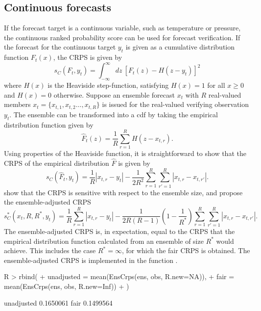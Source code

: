 \documentclass[article]{jss}
\begin{document}
\subsection{Continuous forecasts}


If the forecast target is a continuous variable, such as temperature or pressure, the continuous ranked probability score \citep{matheson1976scoring} can be used for forecast verification.
If the forecast for the continuous target $y_t$ is given as a cumulative distribution function $F_t(x)$, the CRPS is given by 
%
\begin{equation}
s_{C}(F_t, y_t) = \int_{-\infty}^\infty dz\ \left[F_t(z) - H(z-y_t)\right]^2
\end{equation}
%
where $H(x)$ is the Heaviside step-function, satisfying $H(x)=1$ for all $x\ge 0$ and $H(x)=0$ otherwise.
Suppose an ensemble forecast $x_t$ with $R$ real-valued members $x_t = \{x_{t,1}, x_{t,2} \dots, x_{t,R}\}$ is issued for the real-valued verifying observation $y_t$.
The ensemble can be transformed into a cdf by taking the empirical distribution function given by 
%
\begin{equation}
\hat{F}_t(z) = \frac{1}{R} \sum_{r=1}^{R} H(z - x_{t,r}).
\end{equation}
%
Using properties of the Heaviside function, it is straightforward to show that the CRPS of the empirical distribution $\hat{F}$ is given by
%
\begin{equation}
s_{C}(\hat{F}_t, y_t) = \frac{1}{R}|x_{t,r}-y_t| - \frac{1}{2R^2} \sum_{r=1}^R \sum_{r'=1}^R |x_{t,r}-x_{t,r'}|.
\end{equation}
%
\citet{fricker2013three} show that the CRPS is sensitive with respect to the ensemble size, and propose the ensemble-adjusted CRPS
%
\begin{equation}
s_{C}^*(x_t, R, R^*, y_t) = \frac{1}{R}\sum_{r=1}^R |x_{t,r} - y_t| - \frac{1}{2R(R-1)}\left(1-\frac{1}{R^*}\right) \sum_{r=1}^R\sum_{r'=1}^R |x_{t,r}-x_{t,r'}|.
\end{equation}
%
The ensemble-adjusted CRPS is, in expectation, equal to the CRPS that the empirical distribution function calculated from an ensemble of size $R^*$ would achieve.
This includes the case $R^*=\infty$, for which the fair CRPS is obtained.
The ensemble-adjusted CRPS is implemented in the  function .

\begin{Schunk}
\begin{Sinput}
R > rbind(
+   unadjusted = mean(EnsCrps(ens, obs, R.new=NA)), 
+   fair       = mean(EnsCrps(ens, obs, R.new=Inf))
+ )
\end{Sinput}
\begin{Soutput}
                [,1]
unadjusted 0.1650061
fair       0.1499564
\end{Soutput}
\end{Schunk}
\end{document}
